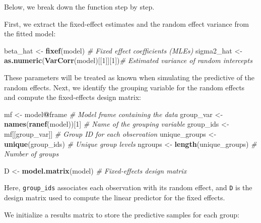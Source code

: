 \documentclass[
  letterpaper,
]{krantz}
\newenvironment{Shaded}{\begin{snugshade}}{\end{snugshade}}
\newcommand{\CommentTok}[1]{\textcolor[rgb]{0.56,0.35,0.01}{\textit{#1}}}
\newcommand{\DecValTok}[1]{\textcolor[rgb]{0.00,0.00,0.81}{#1}}
\newcommand{\FunctionTok}[1]{\textcolor[rgb]{0.13,0.29,0.53}{\textbf{#1}}}
\newcommand{\NormalTok}[1]{#1}
\newcommand{\OtherTok}[1]{\textcolor[rgb]{0.56,0.35,0.01}{#1}}
\newcommand{\SpecialCharTok}[1]{\textcolor[rgb]{0.81,0.36,0.00}{\textbf{#1}}}
\begin{document}
Below, we break down the function step by step.

First, we extract the fixed-effect estimates and the random effect
variance from the fitted model:

\begin{Shaded}
\begin{Highlighting}[]
\NormalTok{beta\_hat }\OtherTok{\textless{}{-}} \FunctionTok{fixef}\NormalTok{(model)                        }\CommentTok{\# Fixed effect coefficients (MLEs)}
\NormalTok{sigma2\_hat }\OtherTok{\textless{}{-}} \FunctionTok{as.numeric}\NormalTok{(}\FunctionTok{VarCorr}\NormalTok{(model)[[}\DecValTok{1}\NormalTok{]][}\DecValTok{1}\NormalTok{])}\CommentTok{\# Estimated variance of random intercepts}
\end{Highlighting}
\end{Shaded}

These parameters will be treated as known when simulating the predictive
of the random effects. Next, we identify the grouping variable for the
random effects and compute the fixed-effects design matrix:

\begin{Shaded}
\begin{Highlighting}[]
\NormalTok{mf }\OtherTok{\textless{}{-}}\NormalTok{ model}\SpecialCharTok{@}\NormalTok{frame                      }\CommentTok{\# Model frame containing the data}
\NormalTok{group\_var }\OtherTok{\textless{}{-}} \FunctionTok{names}\NormalTok{(}\FunctionTok{ranef}\NormalTok{(model))[}\DecValTok{1}\NormalTok{]     }\CommentTok{\# Name of the grouping variable}
\NormalTok{group\_ids }\OtherTok{\textless{}{-}}\NormalTok{ mf[[group\_var]]            }\CommentTok{\# Group ID for each observation}
\NormalTok{unique\_groups }\OtherTok{\textless{}{-}} \FunctionTok{unique}\NormalTok{(group\_ids)      }\CommentTok{\# Unique group levels}
\NormalTok{ngroups }\OtherTok{\textless{}{-}} \FunctionTok{length}\NormalTok{(unique\_groups)        }\CommentTok{\# Number of groups}

\NormalTok{D }\OtherTok{\textless{}{-}} \FunctionTok{model.matrix}\NormalTok{(model)                }\CommentTok{\# Fixed{-}effects design matrix}
\end{Highlighting}
\end{Shaded}

Here, \texttt{group\_ids} associates each observation with its random
effect, and \texttt{D} is the design matrix used to compute the linear
predictor for the fixed effects.

We initialize a results matrix to store the predictive samples for each
group:
\end{document}
